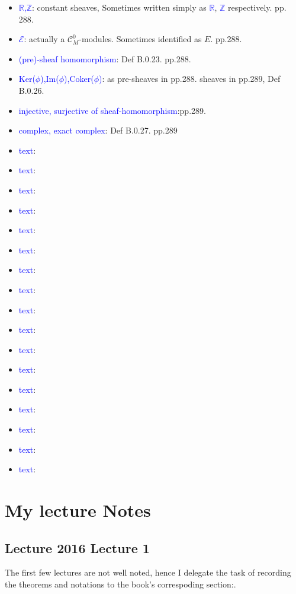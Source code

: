 \documentclass{book}
\numberwithin{equation}{subsection} %
\theoremstyle{definition}
\begin{document}
\begin{itemize}
		\item
		\textcolor{blue}{\underline{$\mathbb{R}$},\underline{$\mathbb{Z}$}}: constant sheaves, Sometimes written simply as \textcolor{blue}{$\mathbb{R}$}, \textcolor{blue}{$\mathbb{Z}$} respectively. pp. 288.
		\item
		\textcolor{blue}{$\mathcal{E}$}: actually a $\mathcal{C}^0_M$-modules. Sometimes identified as $E$. pp.288.
		\item
		\textcolor{blue}{(pre)-sheaf homomorphism}: Def B.0.23.  pp.288.
		\item
		\textcolor{blue}{Ker($\phi$),Im($\phi$),Coker($\phi$)}: as pre-sheaves in pp.288. sheaves in pp.289, Def B.0.26.
		\item
		\textcolor{blue}{injective, surjective of sheaf-homomorphism}:pp.289.
		\item
		\textcolor{blue}{complex, exact complex}: Def B.0.27. pp.289
		\item
		\textcolor{blue}{text}:
		\item
		\textcolor{blue}{text}:
		\item
		\textcolor{blue}{text}:
		\item
		\textcolor{blue}{text}:
		\item
		\textcolor{blue}{text}:
		\item
		\textcolor{blue}{text}:
		\item
		\textcolor{blue}{text}:
		\item
		\textcolor{blue}{text}:
		\item
		\textcolor{blue}{text}:
		\item
		\textcolor{blue}{text}:
		\item
		\textcolor{blue}{text}:
		\item
		\textcolor{blue}{text}:
		\item
		\textcolor{blue}{text}:
		\item
		\textcolor{blue}{text}:
		\item
		\textcolor{blue}{text}:
		\item
		\textcolor{blue}{text}:
		\item
		\textcolor{blue}{text}:	
	\end{itemize}


\chapter{My lecture Notes}

\section{Lecture 2016 Lecture 1}
The first few lectures are not well noted, hence I delegate the task of recording the theorems and notations to the book's correspoding section:.
\end{document}
